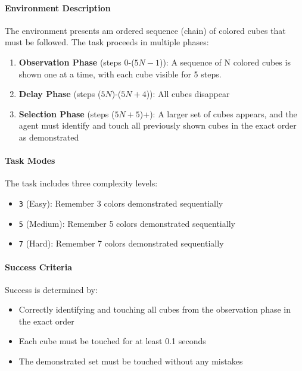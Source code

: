 \paragraph{Environment Description} The environment presents am ordered sequence (chain) of colored cubes that must be followed. The task proceeds in multiple phases:
\begin{enumerate}
    \item \textbf{Observation Phase} (steps 0-($5N-1$)): A sequence of N colored cubes is shown one at a time, with each cube visible for 5 steps.
    \item \textbf{Delay Phase} (steps ($5N$)-($5N+4$)): All cubes disappear
    \item \textbf{Selection Phase} (steps ($5N+5$)+): A larger set of cubes appears, and the agent must identify and touch all previously shown cubes in the exact order as demonstrated
\end{enumerate}

\paragraph{Task Modes} The task includes three complexity levels:
\begin{itemize}
    \item \texttt{3} (Easy): Remember 3 colors demonstrated sequentially
    \item \texttt{5} (Medium): Remember 5 colors demonstrated sequentially
    \item \texttt{7} (Hard): Remember 7 colors demonstrated sequentially
\end{itemize}

\paragraph{Success Criteria} Success is determined by:
\begin{itemize}
    \item Correctly identifying and touching all cubes from the observation phase in the exact order
    \item Each cube must be touched for at least 0.1 seconds
    \item The demonstrated set must be touched without any mistakes
\end{itemize}

